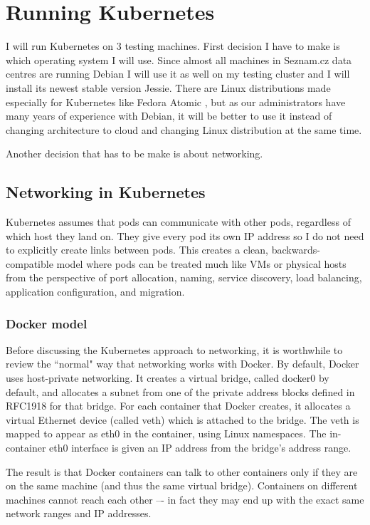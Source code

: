 \chapter{Running Kubernetes}

I will run Kubernetes on 3 testing machines. First decision I have to make is which operating system I will use. Since almost all machines in Seznam.cz data centres are running Debian I will use it as well on my testing cluster and I will install its newest stable version Jessie. There are Linux distributions made especially for Kubernetes like Fedora Atomic \cite{fedora-atomic}, but as our administrators have many years of experience with Debian, it will be better to use it instead of changing architecture to cloud and changing Linux distribution at the same time.

Another decision that has to be make is about networking.

\section{Networking in Kubernetes}

Kubernetes assumes that pods can communicate with other pods, regardless of which host they land on. They give every pod its own IP address so I do not need to explicitly create links between pods. This creates a clean, backwards-compatible model where pods can be treated much like VMs or physical hosts from the perspective of port allocation, naming, service discovery, load balancing, application configuration, and migration. \cite{kubernetesdoc}

\subsection{Docker model}
Before discussing the Kubernetes approach to networking, it is worthwhile to review the ``normal" way that networking works with Docker. By default, Docker uses host-private networking. It creates a virtual bridge, called docker0 by default, and allocates a subnet from one of the private address blocks defined in RFC1918 \cite{rfc1918} for that bridge. For each container that Docker creates, it allocates a virtual Ethernet device (called veth) which is attached to the bridge. The veth is mapped to appear as eth0 in the container, using Linux namespaces. The in-container eth0 interface is given an IP address from the bridge’s address range.

The result is that Docker containers can talk to other containers only if they are on the same machine (and thus the same virtual bridge). Containers on different machines cannot reach each other –- in fact they may end up with the exact same network ranges and IP addresses.


